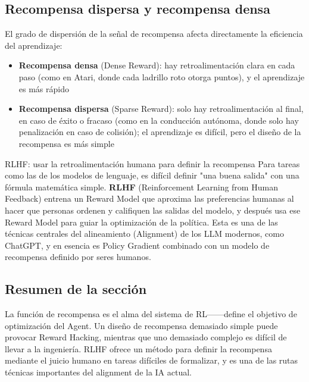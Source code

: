 \subsection{Recompensa dispersa y recompensa densa}

El grado de dispersión de la señal de recompensa afecta directamente la eficiencia del aprendizaje:

\begin{itemize}
    \item \textbf{Recompensa densa} (Dense Reward): hay retroalimentación clara en cada paso (como en Atari, donde cada ladrillo roto otorga puntos), y el aprendizaje es más rápido
    \item \textbf{Recompensa dispersa} (Sparse Reward): solo hay retroalimentación al final, en caso de éxito o fracaso (como en la conducción autónoma, donde solo hay penalización en caso de colisión); el aprendizaje es difícil, pero el diseño de la recompensa es más simple
\end{itemize}

\begin{knowledgebox}{RLHF: usar la retroalimentación humana para definir la recompensa}
Para tareas como las de los modelos de lenguaje, es difícil definir "una buena salida" con una fórmula matemática simple. \textbf{RLHF} (Reinforcement Learning from Human Feedback) entrena un Reward Model que aproxima las preferencias humanas al hacer que personas ordenen y califiquen las salidas del modelo, y después usa ese Reward Model para guiar la optimización de la política. Esta es una de las técnicas centrales del alineamiento (Alignment) de los LLM modernos, como ChatGPT, y en esencia es Policy Gradient combinado con un modelo de recompensa definido por seres humanos.
\end{knowledgebox}

\subsection{Resumen de la sección}

La función de recompensa es el alma del sistema de RL------define el objetivo de optimización del Agent. Un diseño de recompensa demasiado simple puede provocar Reward Hacking, mientras que uno demasiado complejo es difícil de llevar a la ingeniería. RLHF ofrece un método para definir la recompensa mediante el juicio humano en tareas difíciles de formalizar, y es una de las rutas técnicas importantes del alignment de la IA actual.
